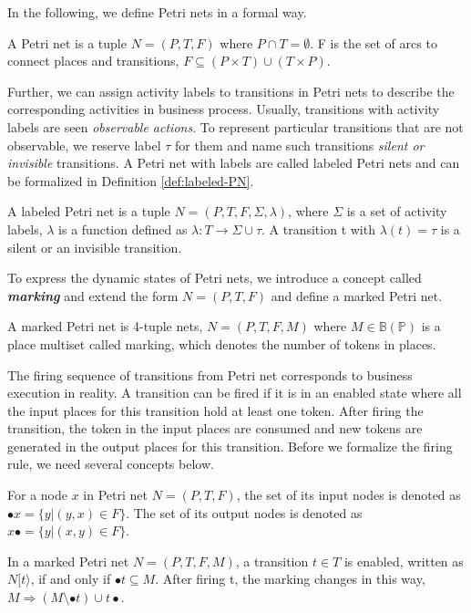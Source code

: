 In the following, we define Petri nets in a formal way.
\begin{definition}
	A Petri net is a tuple $N=(P,T,F)$ where $P \cap T = \emptyset $. F is the set of arcs to connect places and transitions, $F \subseteq (P\times T)\cup (T \times P)$.
\end{definition}
Further, we can assign activity labels to transitions in Petri nets to describe the corresponding activities in business process. Usually, transitions with activity labels are seen \emph{observable actions}. To represent particular transitions that are not observable, we reserve label $\tau$ for them and name such transitions \emph{silent or invisible} transitions. A Petri net with labels are called labeled Petri nets and can be formalized in Definition \ref{def:labeled-PN}.
\begin{definition}\label{def:labeled-PN}	
	A labeled Petri net is a tuple $N=(P,T,F, \Sigma, \lambda)$, where $\Sigma$ is a set of activity labels, $\lambda$ is a function defined as $\lambda: T \rightarrow \Sigma \cup \tau$. A transition t with $\lambda(t)=\tau$ is a silent or an invisible transition.
\end{definition}
To express the dynamic states of Petri nets, we introduce a concept called \textbf{\emph{marking}} and extend the form  $N=(P,T,F)$ and define a marked Petri net. 
\begin{definition}
A marked Petri net is 4-tuple nets, $N=(P,T,F,M)$ where $M \in \mathbb{B(P)}$ is a place multiset called marking, which denotes the number of tokens in places.
\end{definition}
The firing sequence of transitions from Petri net corresponds to business execution in reality. A transition can be fired if it is in an enabled state where all the input places for this transition hold at least one token. After firing the transition, the token in the input places are consumed and new tokens are generated in the output places for this transition. Before we formalize the firing rule, we need several concepts below.
\begin{definition}
	For a node $x$ in Petri net $N=(P,T,F)$, the set of its input nodes is denoted as $\bullet x = \{y\vert (y,x)\in F\}$. The set of its output nodes is denoted as $x\bullet = \{y\vert (x,y)\in F\}$.
\end{definition}
\begin{definition}
	In a marked Petri net $N=(P,T,F,M)$, a transition $t\in T$ is enabled, written as $N[t\rangle$, if and only if $\bullet t \subseteq M$. After firing t, the marking changes in this way, $M \Rightarrow (M\setminus\bullet t)\cup t\bullet$.
\end{definition}
